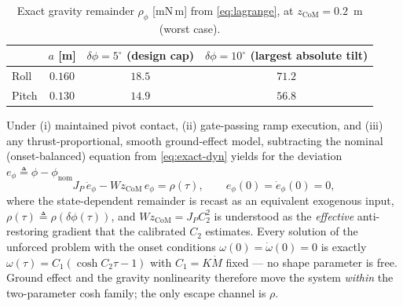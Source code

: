 \begin{table}[h]
\centering
\caption{Exact gravity remainder $\rho_\phi$ [mN\,m] from
\eqref{eq:lagrange}, at $z_{\mathrm{CoM}} = 0.2$~m (worst case).}
\label{tab:rhophi}
\small
\begin{tabular}{@{}lccc@{}}
\hline
& $a$ [m] & $\delta\phi = 5^\circ$ (design cap)
& $\delta\phi = 10^\circ$ (largest absolute tilt) \\
\hline
Roll  & $0.160$ & $18.5$ & $71.2$ \\
Pitch & $0.130$ & $14.9$ & $56.8$ \\
\hline
\end{tabular}
\end{table}

\begin{proposition}
Under (i) maintained pivot contact, (ii) gate-passing ramp execution,
and (iii) any thrust-proportional, smooth ground-effect model,
subtracting the nominal (onset-balanced) equation from
\eqref{eq:exact-dyn} yields for the deviation
$e_\phi \triangleq \phi - \phi_{\mathrm{nom}}$
\begin{equation}
  J_P\,\ddot e_\phi - W z_{\mathrm{CoM}}\, e_\phi = \rho(\tau),
  \qquad e_\phi(0)=\dot e_\phi(0)=0,
  \label{eq:deviation}
\end{equation}
where the state-dependent remainder is recast as an equivalent
exogenous input, $\rho(\tau) \triangleq \rho(\delta\phi(\tau))$, and
$W z_{\mathrm{CoM}} = J_P C_2^2$ is understood as the \emph{effective}
anti-restoring gradient that the calibrated $C_2$ estimates. Every solution of the
unforced problem with the onset conditions
$\omega(0)=\dot\omega(0)=0$ is exactly
$\omega(\tau)=C_1(\cosh C_2\tau - 1)$ with $C_1 = K\dot M$ fixed — no
shape parameter is free. Ground effect and the gravity nonlinearity
therefore move the system \emph{within} the two-parameter cosh family;
the only escape channel is $\rho$.
\end{proposition}

